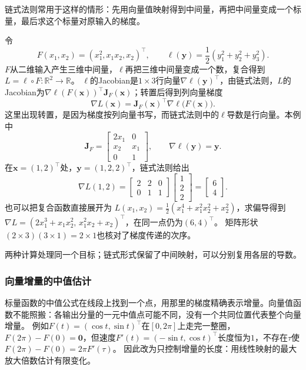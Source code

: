 链式法则常用于这样的情形：先用向量值映射得到中间量，再把中间量变成一个标量，最后求这个标量对原输入的梯度。
\begin{example}[从中间向量求回复合目标的梯度]
\label{ex:analysis-chain-rule-calculation}
令
\[
  F(x_1,x_2)=(x_1^2,x_1x_2,x_2)^\top,
  \qquad \ell(\bm y)=\frac12(y_1^2+y_2^2+y_3^2).
\]
$F$从二维输入产生三维中间量，$\ell$再把三维中间量变成一个数，复合得到$L=\ell\circ F:\mathbb R^2\to\mathbb R$。
$\ell$的Jacobian是$1\times3$行向量$\nabla\ell(\bm y)^\top$，由链式法则，$L$的Jacobian为$\nabla\ell(F(\bm x))^\top\bm J_F(\bm x)$；转置后得到列向量梯度
\[
  \nabla L(\bm x)=\bm J_F(\bm x)^\top\nabla\ell\bigl(F(\bm x)\bigr).
\]
这里出现转置，是因为梯度按列向量书写，而链式法则中的$\ell$导数是行向量。本例中
\[
  \bm J_F=\begin{bmatrix}2x_1&0\\x_2&x_1\\0&1\end{bmatrix},
  \qquad \nabla\ell(\bm y)=\bm y.
\]
在$\bm x=(1,2)^\top$处，$\bm y=(1,2,2)^\top$，链式法则给出
\[
  \nabla L(1,2)
  =\begin{bmatrix}2&2&0\\0&1&1\end{bmatrix}
    \begin{bmatrix}1\\2\\2\end{bmatrix}
  =\begin{bmatrix}6\\4\end{bmatrix}.
\]
也可以把复合函数直接展开为
$L(x_1,x_2)=\tfrac12(x_1^4+x_1^2x_2^2+x_2^2)$，求偏导得到
$\nabla L=(2x_1^3+x_1x_2^2,\,x_1^2x_2+x_2)^\top$，在同一点仍为$(6,4)^\top$。
矩阵形状$(2\times3)(3\times1)=2\times1$也核对了梯度传递的次序。
\end{example}

两种计算处理同一个目标；链式形式保留了中间映射，可以分别复用各层的导数。

\subsubsection{向量增量的中值估计}

标量函数的中值公式在线段上找到一个点，用那里的梯度精确表示增量。向量值函数不能照搬：各输出分量的一元中值点可能不同，没有一个共同位置代表整个向量增量。
例如$F(t)=(\cos t,\sin t)^\top$在$[0,2\pi]$上走完一整圈，$F(2\pi)-F(0)=\bm 0$，但速度$F'(t)=(-\sin t,\cos t)^\top$长度恒为$1$，不存在$\tau$使$F(2\pi)-F(0)=2\pi F'(\tau)$。
因此改为只控制增量的长度：用线性映射的最大放大倍数估计有限变化。

